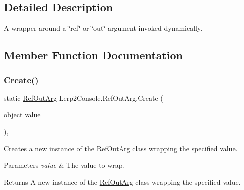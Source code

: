 \subsection{Detailed Description}
A wrapper around a \char`\"{}ref\char`\"{} or \char`\"{}out\char`\"{} argument invoked dynamically. 



\subsection{Member Function Documentation}
\mbox{\label{class_lerp2_console_1_1_ref_out_arg_a66bfca7b6fa2e3980651c17711db0e15}} 
\subsubsection{\texorpdfstring{Create()}{Create()}}
{\footnotesize\ttfamily static \hyperlink{class_lerp2_console_1_1_ref_out_arg}{Ref\+Out\+Arg} Lerp2\+Console.\+Ref\+Out\+Arg.\+Create (\begin{DoxyParamCaption}\item[{object}]{value }\end{DoxyParamCaption})\hspace{0.3cm}{\ttfamily [inline]}, {\ttfamily [static]}}



Creates a new instance of the \hyperlink{class_lerp2_console_1_1_ref_out_arg}{Ref\+Out\+Arg} class wrapping the specified value. 


\begin{DoxyParams}{Parameters}
{\em value} & The value to wrap.\\
\hline
\end{DoxyParams}
\begin{DoxyReturn}{Returns}
A new instance of the \hyperlink{class_lerp2_console_1_1_ref_out_arg}{Ref\+Out\+Arg} class wrapping the specified value.
\end{DoxyReturn}
\mbox{\label{class_lerp2_console_1_1_ref_out_arg_afd558c2b6a220cc05a6af16593f67248}} 
